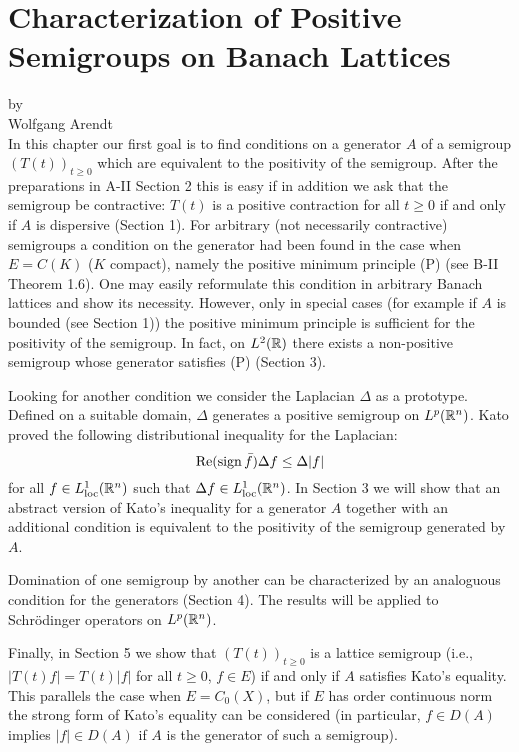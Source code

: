 \chapter{Characterization of Positive Semigroups on Banach Lattices}\label{chap:c2}
{\Large
\vspace*{-.75cm}
by \\[.25em]
Wolfgang Arendt
\vspace{.75cm}
\\
}
In this chapter our first goal is to find conditions on a generator $A$ of a semigroup $(T(t))_{t \geq 0}$ which are equivalent to the positivity of the semigroup.
After the preparations in A-II Section 2 this is easy if in addition we ask that the semigroup be contractive: $T(t)$ is a positive contraction for all $t \geq 0$ if and only if $A$ is dispersive (Section 1).
For arbitrary (not necessarily contractive) semigroups a condition on the generator had been found in the case when $E = C(K)$ ($K$ compact), namely the positive minimum principle (P) (see B-II Theorem 1.6).
One may easily reformulate this condition in arbitrary Banach lattices and show its necessity.
However, only in special cases (for example if $A$ is bounded (see Section 1)) the positive minimum principle is sufficient for the positivity of the semigroup.
In fact, on $L^2(\mathbb{R})$ there exists a non-positive semigroup whose generator satisfies (P) (Section 3).

Looking for another condition we consider the Laplacian $\Delta$ as a prototype.
Defined on a suitable domain, $\Delta$ generates a positive semigroup on $L^p(\mathbb{R}^n)$.
Kato proved the following distributional inequality for the Laplacian:
\[
\mathop{}\!\mathrm{Re}(\operatorname{sign} \bar{f}) \Delta f \leq \Delta|f|
\]
for all $f \in L^1_{\text{loc}}(\mathbb{R}^{n})$ such that $\Delta f \in L^1_{\text{loc}}(\mathbb{R}^{n})$.
In Section 3 we will show that an abstract version of Kato's inequality for a generator $A$ together with an additional condition is equivalent to the positivity of the semigroup generated by $A$.

Domination of one semigroup by another can be characterized by an analoguous condition for the generators (Section 4).
The results will be applied to Schrödinger operators on $L^p(\mathbb{R}^n)$.


Finally, in Section 5 we show that $(T(t))_{t \geq 0}$ is a lattice semigroup (i.e., $|T(t) f| = T(t) |f|$ for all $t \geq 0$, $f \in E$) if and only if $A$ satisfies Kato's equality.
This parallels the case when $E = C_{0}(X)$, but if $E$ has order continuous norm the strong form of Kato's equality can be considered (in particular, $f \in D(A)$ implies $|f| \in D(A)$ if $A$ is the generator of such a semigroup).
